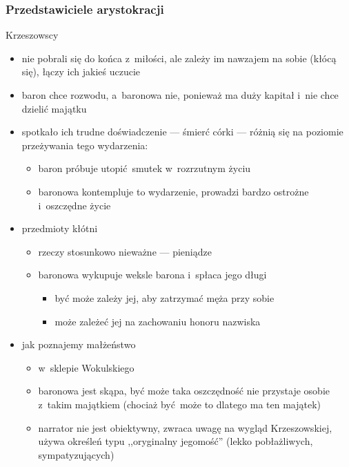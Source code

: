 \subsubsection*{Przedstawiciele arystokracji}
\begin{description}
    \item Krzeszowscy
        \begin{itemize}
            \item nie pobrali się do końca z~miłości, ale zależy im nawzajem na sobie (kłócą się), łączy ich jakieś uczucie
            \item baron chce rozwodu, a~baronowa nie, ponieważ ma duży kapitał i~nie chce dzielić majątku
            \item spotkało ich trudne doświadczenie --- śmierć córki --- różnią się na poziomie przeżywania tego wydarzenia:
                \begin{itemize}
                    \item baron próbuje utopić smutek w~rozrzutnym życiu
                    \item baronowa kontempluje to wydarzenie, prowadzi bardzo ostrożne i~oszczędne życie
                \end{itemize}
            \item przedmioty kłótni
                \begin{itemize}
                    \item rzeczy stosunkowo nieważne --- pieniądze
                    \item baronowa wykupuje weksle barona i~spłaca jego długi
                        \begin{itemize}
                            \item być może zależy jej, aby zatrzymać męża przy sobie
                            \item może zależeć jej na zachowaniu honoru nazwiska
                        \end{itemize}
                \end{itemize}
            \item jak poznajemy małżeństwo
                \begin{itemize}
                    \item w~sklepie Wokulskiego
                    \item baronowa jest skąpa, być może taka oszczędność nie przystaje osobie z~takim majątkiem (chociaż być może to dlatego ma ten majątek)
                    \item narrator nie jest obiektywny, zwraca uwagę na wygląd Krzeszowskiej, używa określeń typu ,,oryginalny jegomość'' (lekko pobłażliwych, sympatyzujących)

\end{itemize}
\end{itemize}
\end{description}
